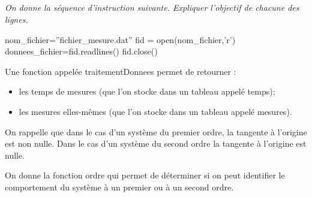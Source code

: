 \documentclass[10pt]{article}
\newif\ifprof
\begin{document}
\subparagraph{}
\textit{On donne la séquence d'instruction suivante. Expliquer l'objectif de chacune des lignes.}

\ifprof
\begin{corrige}
\begin{py}
\begin{minipage}[c]{.05\linewidth}
\end{minipage}\hfill
\begin{minipage}[c]{.95\linewidth}
\begin{python}
nom_fichier=''fichier_mesure.dat''   # Affectation du nom du fichier
fid = open(nom_fichier,'r')          # Ouverture en lecture du fichier
donnees_fichier=fid.readlines()      # Stockage de chacune des lignes du fichier dans 
                                     # un élément de la liste donnees_fichier
fid.close()                          # Fermeture du fichier
\end{python}
\end{minipage}
\end{py}
\end{corrige}
\else
\begin{py}
\begin{minipage}[c]{.05\linewidth}
\end{minipage}\hfill
\begin{minipage}[c]{.95\linewidth}
\begin{python}
nom_fichier=''fichier_mesure.dat''
fid = open(nom_fichier,'r')
donnees_fichier=fid.readlines()
fid.close()
\end{python}
\end{minipage}
\end{py}
\fi



\ifprof
\else
Une fonction appelée \textsf{traitementDonnees} permet de retourner :
\begin{itemize}
\item les temps de mesures (que l'on stocke dans un tableau appelé \textsf{temps});
\item les mesures elles-mêmes (que l'on stocke dans un tableau appelé \textsf{mesures}).
\end{itemize}

On rappelle que dans le cas d'un système du premier ordre, la tangente à l'origine est non nulle. Dans le cas d'un système du second ordre la tangente à l'origine est nulle.
 
On donne la fonction \textsf{ordre} qui permet de déterminer si on peut identifier le comportement du système à un premier ou à un second ordre. 
\fi
\end{document}
